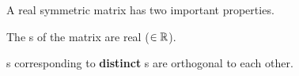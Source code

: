 A real symmetric matrix has two important properties.
\begin{propertylist}
\item The s of the matrix are real ($\in \operatorname{\mathbb{R}}$).\label{prop:Real_Symmetric_Matrix-Real_Eigenvalues}
\item {}s corresponding to \textbf{distinct} s are orthogonal to each other.\label{prop:Real_Symmetric_Matrix-Distinct_Eigenvectors}
\end{propertylist}


